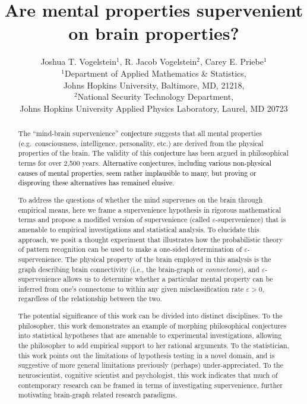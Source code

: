 \documentclass{article}
\title{Are mental properties supervenient on brain properties?}
\author{Joshua T. Vogelstein$^1$, R. Jacob Vogelstein$^2$, Carey E. Priebe$^1$\\
$^1$Department of Applied Mathematics \& Statistics, \\ Johns Hopkins University, Baltimore, MD, 21218,\\ $^2$National Security Technology Department, \\ Johns Hopkins University Applied Physics Laboratory, Laurel, MD 20723
}
\providecommand{\tr}[1]{\textcolor{black}{#1}}
\begin{document}
\maketitle
\begin{abstract}

The ``mind-brain supervenience'' \tr{conjecture} suggests that all mental properties (e.g.\ consciousness, intelligence, personality, etc.) are derived from the physical properties of the brain. The validity of this \tr{conjecture} has been argued in philosophical terms for over 2,500 years. \tr{Alternative conjectures, including various non-physical causes of mental properties, seem rather implausible to many, but proving or disproving these alternatives has remained elusive.}  

To address the questions of whether the mind supervenes on the brain through empirical means, here we frame a supervenience hypothesis in rigorous mathematical terms and propose a modified version of supervenience (called $\varepsilon$-supervenience) that is amenable to empirical investigations and statistical analysis. To elucidate this approach, we posit a thought experiment that illustrates how the probabilistic theory of pattern recognition can be used to make a one-sided determination of $\varepsilon$-supervenience. The physical property of the brain employed in this analysis is the graph describing brain connectivity (i.e., the brain-graph or \emph{connectome}), and $\varepsilon$-supervenience allows us to determine whether a particular mental property can be inferred from one's connectome to within any given misclassification rate $\varepsilon > 0$, regardless of the relationship between the two. %

The potential significance of this work can be divided into distinct disciplines.  To the philosopher, this work demonstrates an example of morphing philosophical conjectures into statistical hypotheses that are amenable to experimental investigations, allowing the philosopher to add empirical support to her rational arguments.  To the statistician, this work points out the limitations of hypothesis testing in a novel domain, and is suggestive of more general limitations previously (perhaps) under-appreciated.   To the neuroscientist, cognitive scientist and psychologist, this work indicates that much of contemporary research can be framed in terms of investigating supervenience, further motivating brain-graph related research paradigms.



\end{abstract}
\end{document}
